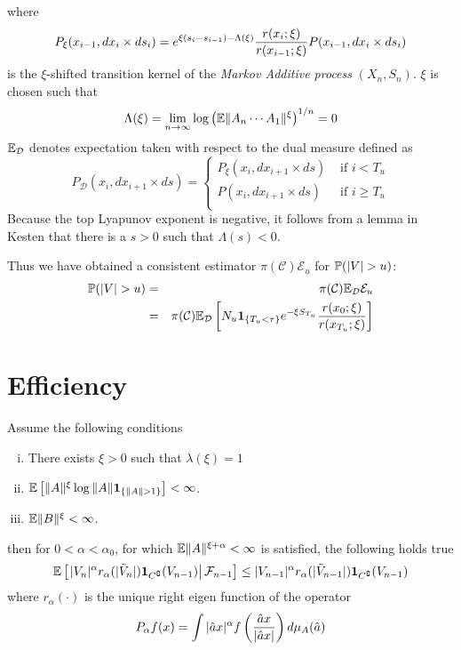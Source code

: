 \documentclass{article}
\begin{document}
where
\[
P_\xi(x_{i-1}, dx_i \times ds_i) = e^{\xi(s_i - s_{i-1}) -
  \Lambda(\xi)} {r(x_i; \xi) \over r(x_{i-1}; \xi)} P(x_{i-1}, dx_i
\times ds_i)
\]
is the $\xi$-shifted transition kernel of the {\it Markov Additive
  process} $(X_n, S_n)$. $\xi$ is chosen such that 
\[
\Lambda(\xi) = \lim_{n \to \infty} \log \left(
\E \|A_n \cdots A_1\|^\xi
\right)^{1/n} = 0
\]
$\E_{\mathcal D}$ denotes expectation taken with respect to the dual
measure defined as
\[
P_{\mathcal D} (x_i, dx_{i+1} \times ds) = \left\{
  \begin{array}{ll}
    P_\xi (x_i, dx_{i+1} \times ds) & \text{ if } i < T_u \\
    P(x_i, dx_{i+1} \times ds) & \text{ if } i \geq T_u \\
  \end{array}
\right.
\]
Because the top Lyapunov exponent is negative, it follows from a lemma
in Kesten \cite{Kesten1973} that there is a $s > 0$ such that
$\Lambda(s) < 0$.

Thus we have obtained a consistent estimator
$\pi(\mathcal C)\mathcal E_u$ for $\P(|V| > u)$:
\begin{eqnarray*}
\P(|V| > u) &=& \pi(\mathcal C) \E_{\mathcal D} \mathcal E_u \\
&=& \pi(\mathcal C) \E_{\mathcal D} \left[
  N_u \1{T_u < \tau} e^{-\xi S_{T_u}} {r(x_0; \xi)
    \over r(x_{T_u}; \xi)}
\right]
\end{eqnarray*}

\section{Efficiency}\label{sec:efficiency}
\begin{lemma}
  Assume the following conditions
  \begin{enumerate}[(i)]
  \item There exists $\xi > 0$ such that $\lambda(\xi) = 1$
  \item $\E\left[
      \|A\|^{\xi} \log\|A\|\1{\|A\| > 1}
      \right] < \infty$.
  \item $\E \|B\|^{\xi} < \infty$.
  \end{enumerate}
  then for $0 < \alpha < \alpha_0$, for which $\E\|A\|^{\xi + \alpha} <
  \infty$ is satisfied, the following holds true
  \begin{equation}
    \label{eq:drift}
    \E \left[\left.
        |V_n|^\alpha r_{\alpha}(|\tilde V_n|) \I{C^\complement}(V_{n-1}) \right|
      \mathcal F_{n-1} \right] \leq |V_{n-1}|^\alpha r_{\alpha}(|\tilde
    V_{n-1}|) \I{C^\complement}(V_{n-1})
  \end{equation}
  where $r_{\alpha}(\cdot)$ is the unique right eigen function of the
  operator
  \[
  P_{\alpha} f(x) = \int |\hat a x|^\alpha f\left(
    {\hat a x \over |\hat a x|}
  \right) d\mu_A(\hat a)
  \]
\end{lemma}
\end{document}
